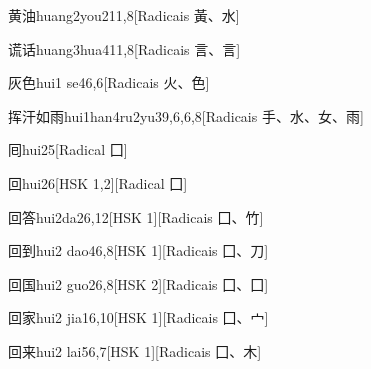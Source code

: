 \begin{entry}{黄油}{huang2you2}{11,8}[Radicais ⿈、⽔]
\end{entry}

\begin{entry}{谎话}{huang3hua4}{11,8}[Radicais ⾔、⾔]
\end{entry}

\begin{entry}{灰色}{hui1 se4}{6,6}[Radicais ⽕、⾊]
\end{entry}

\begin{entry}{挥汗如雨}{hui1han4ru2yu3}{9,6,6,8}[Radicais ⼿、⽔、⼥、⾬]
\end{entry}

\begin{entry}{囘}{hui2}{5}[Radical ⼞]
\end{entry}

\begin{entry}{回}{hui2}{6}[HSK 1,2][Radical ⼞]
\end{entry}

\begin{entry}{回答}{hui2da2}{6,12}[HSK 1][Radicais ⼞、⽵]
\end{entry}

\begin{entry}{回到}{hui2 dao4}{6,8}[HSK 1][Radicais ⼞、⼑]
\end{entry}

\begin{entry}{回国}{hui2 guo2}{6,8}[HSK 2][Radicais ⼞、⼞]
\end{entry}

\begin{entry}{回家}{hui2 jia1}{6,10}[HSK 1][Radicais ⼞、⼧]
\end{entry}

\begin{entry}{回来}{hui2 lai5}{6,7}[HSK 1][Radicais ⼞、⽊]
\end{entry}

